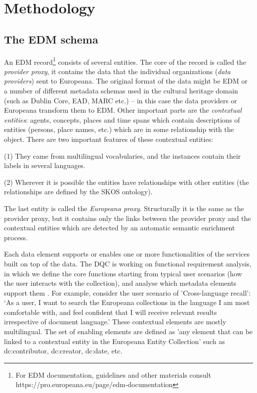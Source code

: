 \section{Methodology}

\subsection{The EDM schema}

An EDM record\footnote{For EDM documentation, guidelines and other materials consult https://pro.europeana.eu/page/edm-documentation} consists of several entities. The core of the record is called the \emph{provider proxy}, it contains the data that the individual organizations (\emph{data providers}) sent to Europeana. The original format of the data might be EDM or a number of different metadata schemas used in the cultural heritage domain (such as Dublin Core, EAD, MARC etc.) – in this case the data providers or Europeana transform them to EDM. Other important parts are the \emph{contextual entities}: agents, concepts, places and time spans which contain descriptions of entities (persons, place names, etc.) which are in some relationship with the object. There are two important features of these contextual entities:

(1) They came from multilingual vocabularies, and the instances contain their labels in several languages.

(2) Wherever it is possible the entities have relationships with other entities (the relationships are defined by the SKOS ontology).

The last entity is called the \emph{Europeana proxy}. Structurally it is the same as the provider proxy, but it contains only the links between the provider proxy and the contextual entities which are detected by an automatic semantic enrichment process.

Each data element supports or enables one or more functionalities of the services built on top of the data. The DQC is working on functional requirement analysis, in which we define the core functions starting from typical user scenarios (how the user interacts with the collection), and analyse which metadata elements support them \cite{hill-charles-isaac2015}. For example, consider the user scenario of ’Cross-language recall’: ‘As a user, I want to search the Europeana collections in the language I am most comfortable with, and feel confident that I will receive relevant results irrespective of document language.’ These contextual elements are mostly multilingual. The set of enabling elements are defined as 'any element that can be linked to a contextual entity in the Europeana Entity Collection' such as dc:contributor, dc:creator, dc:date, etc.


